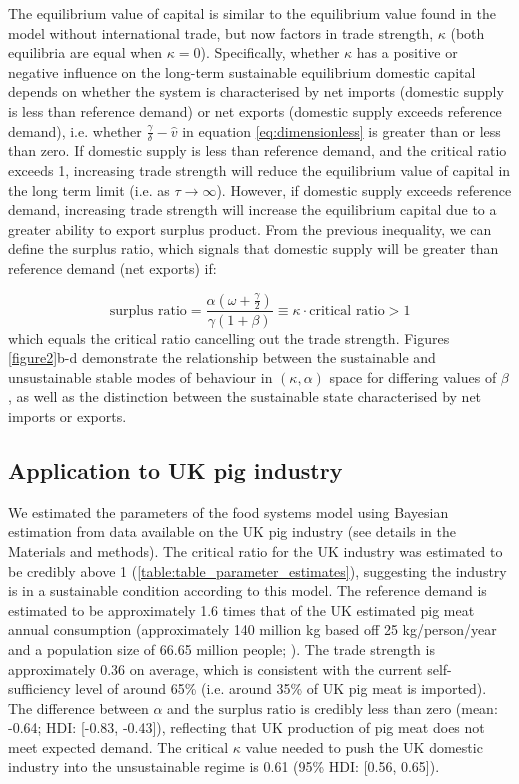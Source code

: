 \documentclass[9pt,twocolumn,twoside,lineno]{pnas-new}
\begin{document}
The equilibrium value of capital is similar to the equilibrium value found in the model without international trade, but now factors in trade strength, $\kappa$ (both equilibria are equal when $\kappa = 0$). Specifically, whether $\kappa$ has a positive or negative influence on the long-term sustainable equilibrium domestic capital depends on whether the system is characterised by net imports (domestic supply is less than reference demand) or net exports (domestic supply exceeds reference demand), i.e. whether $\frac{\gamma}{\delta} - \hat{v}$ in equation \ref{eq:dimensionless} is greater than or less than zero. If domestic supply is less than reference demand, and the critical ratio exceeds 1, increasing trade strength will reduce the equilibrium value of capital in the long term limit (i.e. as $\tau \rightarrow \infty$). However, if domestic supply exceeds reference demand, increasing trade strength will increase the equilibrium capital due to a greater ability to export surplus product. From the previous inequality, we can define the surplus ratio, which signals that domestic supply will be greater than reference demand (net exports) if:

\begin{equation}
  \text{surplus ratio} = \frac{\alpha (\omega + \frac{\gamma}{2})}{\gamma (1 + \beta)} \equiv \kappa \cdot \text{critical ratio} > 1
\end{equation}
%
which equals the critical ratio cancelling out the trade strength. Figures \ref{figure2}b-d demonstrate the relationship between the sustainable and unsustainable stable modes of behaviour in $(\kappa, \alpha)$ space for differing values of $\beta$, as well as the distinction between the sustainable state characterised by net imports or exports.

\subsection*{Application to UK pig industry}
We estimated the parameters of the food systems model using Bayesian estimation from data available on the UK pig industry (see details in the Materials and methods). The critical ratio for the UK industry was estimated to be credibly above 1 (\ref{table:table_parameter_estimates}), suggesting the industry is in a sustainable condition according to this model. The reference demand is estimated to be approximately 1.6 times that of the UK estimated pig meat annual consumption (approximately 140 million kg based off 25 kg/person/year and a population size of 66.65 million people; \cite{AHDBpocketbook2018}). The trade strength is approximately 0.36 on average, which is consistent with the current self-sufficiency level of around 65\% (i.e. around 35\% of UK pig meat is imported). The difference between $\alpha$ and the $\text{surplus ratio}$ is credibly less than zero (mean: -0.64; HDI: [-0.83, -0.43]), reflecting that UK production of pig meat does not meet expected demand. The critical $\kappa$ value needed to push the UK domestic industry into the unsustainable regime is 0.61 (95\% HDI: [0.56, 0.65]).
\end{document}
